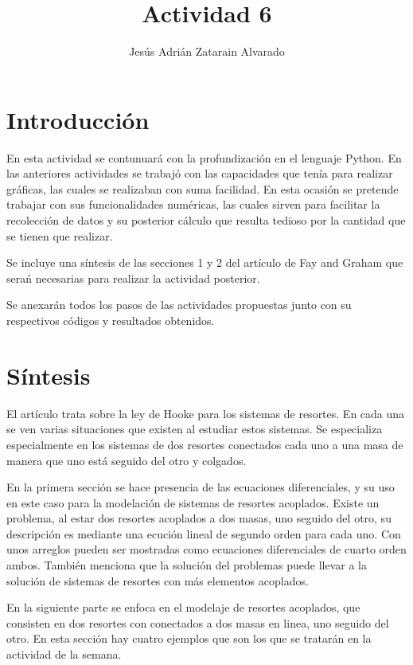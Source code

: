 \documentclass{article}
\title{Actividad 6}
\author{Jesús Adrián Zatarain Alvarado}
\begin{document}
\maketitle

\section{Introducción}

En esta actividad se contunuará con la profundización en el lenguaje Python. En las anteriores actividades se trabajó con las capacidades que tenía para realizar gráficas, las cuales se realizaban con suma facilidad. En esta ocasión se pretende trabajar con sus funcionalidades numéricas, las cuales sirven para facilitar la recolección de datos y su posterior cálculo que resulta tedioso por la cantidad que se tienen que realizar.

Se incluye una síntesis de las secciones 1 y 2 del artículo de Fay and Graham que serań necesarias para realizar la actividad posterior.

Se anexarán todos los pasos de las actividades propuestas junto con su respectivos códigos y resultados obtenidos.

\section{Síntesis}

El artículo trata sobre la ley de Hooke para los sistemas de resortes. En cada una se ven varias situaciones que existen al estudiar estos sistemas. Se especializa especialmente en los sistemas de dos resortes conectados cada uno a una masa de manera que uno está seguido del otro y colgados.

En la primera sección se hace presencia de las ecuaciones diferenciales, y su uso en este caso para la modelación de sistemas de resortes acoplados. Existe un problema, al estar dos resortes acoplados a dos masas, uno seguido del otro, su descripción es mediante una ecución lineal de segundo orden para cada uno. Con unos arreglos pueden ser mostradas como ecuaciones diferenciales de cuarto orden ambos. También menciona que la solución del problemas puede llevar a la solución de sistemas de resortes con más elementos acoplados.

En la siguiente parte se enfoca en el modelaje de resortes acoplados, que consisten en dos resortes con conectados a dos masas en linea, uno seguido del otro. En esta sección hay cuatro ejemplos que son los que se tratarán en la actividad de la semana.
\end{document}

